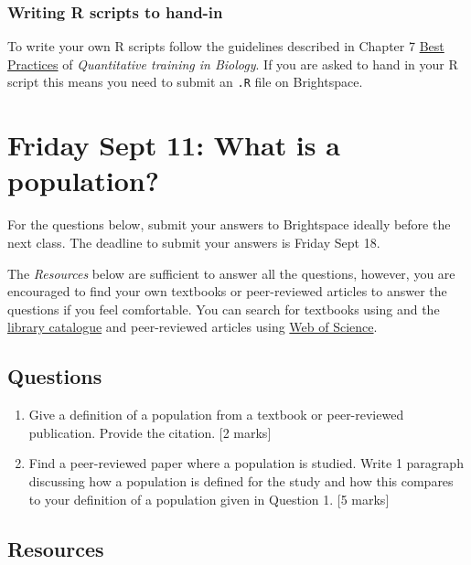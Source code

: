 \documentclass[]{book}
\begin{document}
\subsection{Writing R scripts to hand-in}\label{RScript}

To write your own R scripts follow the guidelines described in Chapter 7
\href{https://ahurford.github.io/quant-guide-all-courses/style.html}{Best
Practices} of \emph{Quantitative training in Biology}. If you are asked
to hand in your R script this means you need to submit an \texttt{.R}
file on Brightspace.

\chapter{Friday Sept 11: What is a
population?}\label{friday-sept-11-what-is-a-population}

For the questions below, submit your answers to Brightspace ideally
before the next class. The deadline to submit your answers is Friday
Sept 18.

The \emph{Resources} below are sufficient to answer all the questions,
however, you are encouraged to find your own textbooks or peer-reviewed
articles to answer the questions if you feel comfortable. You can search
for textbooks using and the \href{https://www.library.mun.ca/}{library
catalogue} and peer-reviewed articles using
\href{https://apps-webofknowledge-com.qe2a-proxy.mun.ca/WOS_GeneralSearch_input.do?product=WOS\&search_mode=GeneralSearch\&SID=5COlVVH7qj2puc72yvk\&preferencesSaved=}{Web
of Science}.

\section{Questions}\label{questions}

\begin{enumerate}
\def\labelenumi{\arabic{enumi}.}
\item
  Give a definition of a population from a textbook or peer-reviewed
  publication. Provide the citation. {[}2 marks{]}
\item
  Find a peer-reviewed paper where a population is studied. Write 1
  paragraph discussing how a population is defined for the study and how
  this compares to your definition of a population given in Question 1.
  {[}5 marks{]}
\end{enumerate}

\section{Resources}\label{resources}
\end{document}
